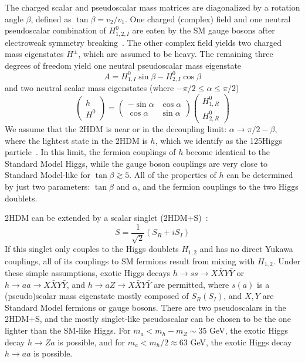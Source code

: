 The charged scalar and pseudoscalar mass matrices are diagonalized by a rotation angle $\beta$, defined as $\tan\beta = v_2/v_1$. One charged (complex) field and one neutral pseudoscalar combination of $H^0_{1, 2, I}$ are eaten by the SM gauge bosons after electroweak symmetry breaking~\cite{2HDM-PhysRevD.90.075004}. The other complex field yields two charged mass eigenstates $H^\pm$, which are assumed to be heavy. The remaining three degrees of freedom yield one neutral pseudoscalar mass eigenstate 
\begin{equation}
    A = H^0_{1, I}\sin\beta - H^0_{2, I} \cos\beta
\end{equation}
and two neutral scalar mass eigenstates (where $-\pi/2 \leq \alpha \leq \pi/2$)
\begin{equation}
    \begin{pmatrix} h \\ H^0 \end{pmatrix} = \begin{pmatrix} -\sin\alpha & \cos\alpha \\
                                                              \cos\alpha & \sin\alpha \end{pmatrix}
                                             \begin{pmatrix} H^0_{1, R} \\ H^0_{2, R}  \end{pmatrix}
\end{equation}
We assume that the 2HDM is near or in the decoupling limit: $\alpha \rightarrow \pi/2 - \beta$, where the lightest state in the 2HDM is $h$, which we identify as the 125\GeV Higgs particle~\cite{2HDM-PhysRevD.90.075004}. In this limit, the fermion couplings of $h$ become identical to the Standard Model Higgs, while the gauge boson couplings are very close to Standard Model-like for $\tan\beta \gtrsim 5$. All of the properties of $h$ can be determined by just two parameters: $\tan\beta$ and $\alpha$, and the fermion couplings to the two Higgs doublets. 

2HDM can be extended by a scalar singlet (2HDM+S)~\cite{2HDM-PhysRevD.90.075004}:
\begin{equation}
    S = \frac{1}{\sqrt{2}} (S_R + iS_I)
\end{equation}
If this singlet only couples to the Higgs doublets $H_{1,2}$ and has no direct Yukawa couplings, all of its couplings to SM fermions result from mixing with $H_{1,2}$. Under these simple assumptions, exotic Higgs decays $h\rightarrow ss \rightarrow X\bar{X}Y\bar{Y}$ or $h\rightarrow aa \rightarrow X\bar{X}Y\bar{Y}$, and $h \rightarrow aZ \rightarrow X\bar{X}Y\bar{Y}$ are permitted, where $s(a)$ is a (pseudo)scalar mass eigenstate mostly composed of $S_R (S_I)$, and $X, Y$ are Standard Model fermions or gauge bosons. There are two pseudoscalars in the 2HDM+S, and the mostly singlet-like pseudoscalar can be chosen to be the one lighter than the SM-like Higgs. For $m_a < m_h - m_Z \sim 35$ GeV, the exotic Higgs decay $h \rightarrow Za$ is possible, and for $m_a < m_h/2 \approx 63$ GeV, the exotic Higgs decay $h \rightarrow aa$ is possible. 

